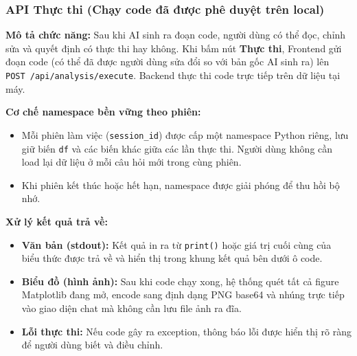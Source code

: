 \subsubsection{API Thực thi (Chạy code đã được phê duyệt trên local)}
\label{subsubsec:api_execute}

\noindent\textbf{Mô tả chức năng:}
Sau khi AI sinh ra đoạn code, người dùng có thể đọc, chỉnh sửa và quyết định có thực thi hay không. Khi bấm nút \textbf{Thực thi}, Frontend gửi đoạn code (có thể đã được người dùng sửa đổi so với bản gốc AI sinh ra) lên \texttt{POST /api/analysis/execute}. Backend thực thi code trực tiếp trên dữ liệu tại máy.

\noindent\textbf{Cơ chế namespace bền vững theo phiên:}
\begin{itemize}
    \item Mỗi phiên làm việc (\texttt{session\_id}) được cấp một namespace Python riêng, lưu giữ biến \texttt{df} và các biến khác giữa các lần thực thi. Người dùng không cần load lại dữ liệu ở mỗi câu hỏi mới trong cùng phiên.
    \item Khi phiên kết thúc hoặc hết hạn, namespace được giải phóng để thu hồi bộ nhớ.
\end{itemize}

\noindent\textbf{Xử lý kết quả trả về:}
\begin{itemize}
    \item \textbf{Văn bản (stdout):} Kết quả in ra từ \texttt{print()} hoặc giá trị cuối cùng của biểu thức được trả về và hiển thị trong khung kết quả bên dưới ô code.
    \item \textbf{Biểu đồ (hình ảnh):} Sau khi code chạy xong, hệ thống quét tất cả figure Matplotlib đang mở, encode sang định dạng PNG base64 và nhúng trực tiếp vào giao diện chat mà không cần lưu file ảnh ra đĩa.
    \item \textbf{Lỗi thực thi:} Nếu code gây ra exception, thông báo lỗi được hiển thị rõ ràng để người dùng biết và điều chỉnh.
\end{itemize}

